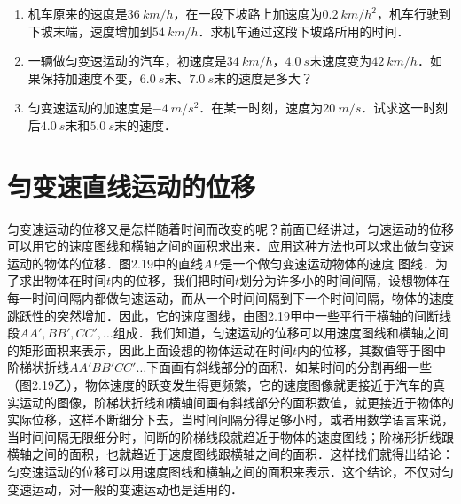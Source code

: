 \begin{enumerate}
    \item 机车原来的速度是$\qty{36}{km/h}$，在一段下坡路上加速度为$\qty{0.2}{km/h^2}$，机车行驶到下坡末端，速度增加到$\qty{54}{km/h}$．求机车通过这段下坡路所用的时间．
    \item 一辆做匀变速运动的汽车，初速度是$\qty{34}{km/h}$，$\qty{4.0}{s}$末速度变为$\qty{42}{km/h}$．如果保持加速度不变，$\qty{6.0}{s}$末、$\qty{7.0}{s}$末的速度是多大？
    \item 匀变速运动的加速度是$\qty{-4}{m/s^2}$．在某一时刻，速度为$\qty{20}{m/s}$．试求这一时刻后$\qty{4.0}{s}$末和$\qty{5.0}{s}$末的速度．
\end{enumerate}

\newpage

\section{匀变速直线运动的位移}
匀变速运动的位移又是怎样随着时间而改变的呢？前面已经讲过，匀速运动的位移可以用它的速度图线和横轴之间的面积求出来．应用这种方法也可以求出做匀变速运动的物体的位移．图2.19中的直线$AP$是一个做匀变速运动物体的速度
图线．为了求出物体在时间$t$内的位移，我们把时间$t$划分为许多小的时间间隔，设想物体在每一时间间隔内都做匀速运动，而从一个时间间隔到下一个时间间隔，物体的速度跳跃性的突然增加．因此，它的速度图线，由图2.19甲中一些平行于横轴的间断线段$AA',BB',CC',\ldots$组成．我们知道，匀速运动的位移可以用速度图线和横轴之间的矩形面积来表示，因此上面设想的物体运动在时间$t$内的位移，其数值等于图中阶梯状折线$AA'BB'CC'\ldots$下面画有斜线部分的面积．如某时间的分割再细一些（图2.19乙），物体速度的跃变发生得更频繁，它的速度图像就更接近于汽车的真实运动的图像，阶梯状折线和横轴间画有斜线部分的面积数值，就更接近于物体的实际位移，这样不断细分下去，当时间间隔分得足够小时，或者用数学语言来说，当时间间隔无限细分时，间断的阶梯线段就趋近于物体的速度图线；阶梯形折线跟横轴之间的面积，也就趋近于速度图线跟横轴之间的面积．这样找们就得出结论：匀变速运动的位移可以用速度图线和横轴之间的面积来表示．这个结论，不仅对匀变速运动，对一般的变速运动也是适用的．
